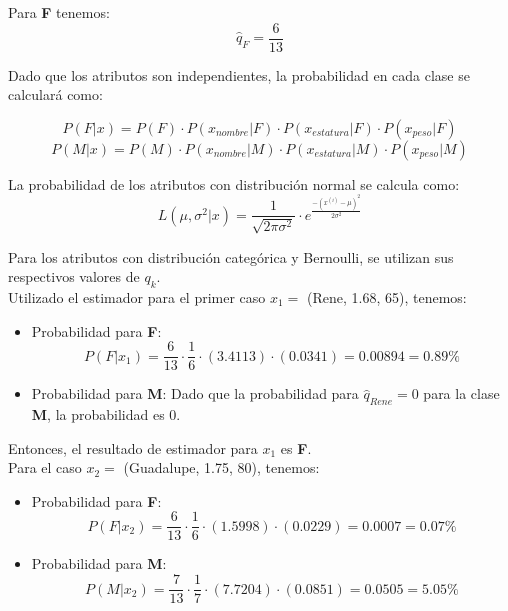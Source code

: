 \documentclass[letterpaper,12pt]{article}
\theoremstyle{definition}
\begin{document}
Para \textbf{F} tenemos:
\begin{equation}
  \hat{q}_{F} = \frac{6}{13}
\end{equation}

Dado que los atributos son independientes, la probabilidad en cada clase se calculará como:

\begin{equation}
  P(F|x) = P(F) \cdot P(x_{nombre}|F) \cdot P(x_{estatura}|F) \cdot P(x_{peso}|F)
\end{equation}
\begin{equation}
  P(M|x) = P(M) \cdot P(x_{nombre}|M) \cdot P(x_{estatura}|M) \cdot P(x_{peso}|M)
\end{equation}

La probabilidad de los atributos con distribución normal se calcula como:
\begin{equation}
  L(\mu,\sigma^2|x) = \frac{1}{\sqrt{2 \pi \sigma^2}} \cdot e^{\frac{-(x^{(i)}-\mu)^2}{2 \sigma^2}}
\end{equation}

Para los atributos con distribución categórica y Bernoulli, se utilizan sus respectivos valores de \(q_k\).\\

Utilizado el estimador para el primer caso \(x_1 = \) (Rene, 1.68, 65), tenemos:
\begin{itemize}
  \item Probabilidad para \textbf{F}:
  \begin{equation}
    P(F|x_1) = \frac{6}{13}  \cdot \frac{1}{6} \cdot (3.4113) \cdot (0.0341) = 0.00894 = 0.89\%
  \end{equation}
  \item Probabilidad para \textbf{M}: Dado que la probabilidad para \(\hat{q}_{Rene} = 0\) para la clase \textbf{M}, la probabilidad es 0.
\end{itemize}
\medskip

Entonces, el resultado de estimador para \(x_1\) es \textbf{F}.\\

Para el caso \(x_2 = \) (Guadalupe, 1.75, 80), tenemos:
\begin{itemize}
  \item Probabilidad para \textbf{F}:
  \begin{equation}
    P(F|x_2) = \frac{6}{13}  \cdot \frac{1}{6} \cdot (1.5998) \cdot (0.0229) = 0.0007 = 0.07\%
  \end{equation}
  \item Probabilidad para \textbf{M}: 
  \begin{equation}
    P(M|x_2) = \frac{7}{13}  \cdot \frac{1}{7} \cdot (7.7204) \cdot (0.0851) = 0.0505 = 5.05\%
  \end{equation}
\end{itemize}
\medskip
\end{document}
